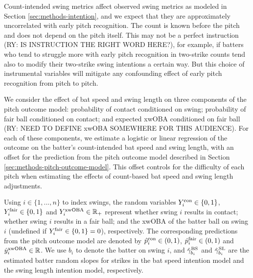 \documentclass{article}
\begin{document}
      Count-intended swing metrics affect observed swing metrics as modeled in Section \ref{sec:methods-intention}, and we expect that they are approximately uncorrelated with early pitch recognition. The count is known before the pitch and does not depend on the pitch itself. This may not be a perfect instruction (RY: IS INSTRUCTION THE RIGHT WORD HERE?), for example, if batters who tend to struggle more with early pitch recognition in two-strike counts tend also to modify their two-strike swing intentions a certain way. But this choice of instrumental variables will mitigate any confounding effect of early pitch recognition from pitch to pitch.

      We consider the effect of bat speed and swing length on three components of the pitch outcome model: probability of contact conditioned on swing; probability of fair ball conditioned on contact; and expected xwOBA conditioned on fair ball (RY: NEED TO DEFINE xwOBA SOMEWHERE FOR THIS AUDIENCE). For each of these components, we estimate a logistic or linear regression of the outcome on the batter's count-intended bat speed and swing length, with an offset for the prediction from the pitch outcome model described in Section \ref{sec:methods-pitch-outcome-model}. This offset controls for the difficulty of each pitch when estimating the effects of count-based bat speed and swing length adjustments.

      Using $i \in \{1, ..., n\}$ to index swings, the random variables $Y_i^{\mbox{\scriptsize con}} \in \{0, 1\}$, $Y_i^{\mbox{\scriptsize fair}} \in \{0, 1\}$ and $Y_i^{\mbox{\scriptsize xwOBA}} \in \mathbb{R}_+$ represent whether swing $i$ results in contact; whether swing $i$ results in a fair ball; and the xwOBA of the batter ball on swing $i$ (undefined if $Y_i^{\mbox{\scriptsize fair}} \in \{0, 1\} = 0$), respectively. The corresponding predictions from the pitch outcome model are denoted by $\hat p_i^{\mbox{\scriptsize con}} \in (0, 1)$,  $\hat p_i^{\mbox{\scriptsize fair}} \in (0, 1)$ and $\hat y_i^{\mbox{\scriptsize xwOBA}} \in \mathbb{R}$. We use $b_i$ to denote the batter on swing $i$, and $\hat\gamma_{b_i}^{\mbox{\scriptsize BS}}$ and $\hat\gamma_{b_i}^{\mbox{\scriptsize SL}}$ are the estimated batter random slopes for strikes in the bat speed intention model and the swing length intention model, respectively.
\end{document}
